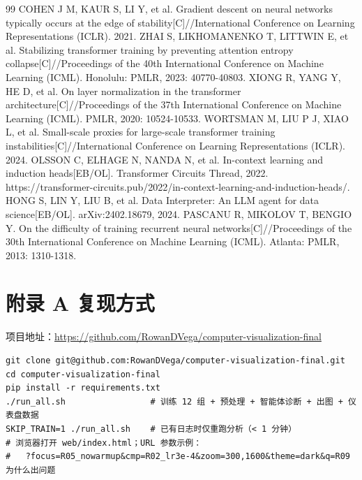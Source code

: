\begin{thebibliography}{99}
 COHEN J M, KAUR S, LI Y, et al. Gradient descent on neural networks typically occurs at the edge of stability[C]//International Conference on Learning Representations (ICLR). 2021.
 ZHAI S, LIKHOMANENKO T, LITTWIN E, et al. Stabilizing transformer training by preventing attention entropy collapse[C]//Proceedings of the 40th International Conference on Machine Learning (ICML). Honolulu: PMLR, 2023: 40770-40803.
 XIONG R, YANG Y, HE D, et al. On layer normalization in the transformer architecture[C]//Proceedings of the 37th International Conference on Machine Learning (ICML). PMLR, 2020: 10524-10533.
 WORTSMAN M, LIU P J, XIAO L, et al. Small-scale proxies for large-scale transformer training instabilities[C]//International Conference on Learning Representations (ICLR). 2024.
 OLSSON C, ELHAGE N, NANDA N, et al. In-context learning and induction heads[EB/OL]. Transformer Circuits Thread, 2022. https://transformer-circuits.pub/2022/in-context-learning-and-induction-heads/.
 HONG S, LIN Y, LIU B, et al. Data Interpreter: An LLM agent for data science[EB/OL]. arXiv:2402.18679, 2024.
 PASCANU R, MIKOLOV T, BENGIO Y. On the difficulty of training recurrent neural networks[C]//Proceedings of the 30th International Conference on Machine Learning (ICML). Atlanta: PMLR, 2013: 1310-1318.
\end{thebibliography}



\section*{附录 A 复现方式}

\noindent 项目地址：\url{https://github.com/RowanDVega/computer-visualization-final}

\begin{Verbatim}[fontsize=\small,frame=single,breaklines,breakanywhere]
git clone git@github.com:RowanDVega/computer-visualization-final.git
cd computer-visualization-final
pip install -r requirements.txt
./run_all.sh                 # 训练 12 组 + 预处理 + 智能体诊断 + 出图 + 仪表盘数据
SKIP_TRAIN=1 ./run_all.sh    # 已有日志时仅重跑分析（< 1 分钟）
# 浏览器打开 web/index.html；URL 参数示例：
#   ?focus=R05_nowarmup&cmp=R02_lr3e-4&zoom=300,1600&theme=dark&q=R09为什么出问题
\end{Verbatim}
